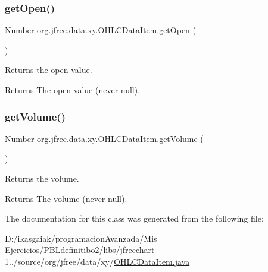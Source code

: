 \subsubsection{\texorpdfstring{get\+Open()}{getOpen()}}
{\footnotesize\ttfamily Number org.\+jfree.\+data.\+xy.\+O\+H\+L\+C\+Data\+Item.\+get\+Open (\begin{DoxyParamCaption}{ }\end{DoxyParamCaption})}

Returns the open value.

\begin{DoxyReturn}{Returns}
The open value (never {\ttfamily null}). 
\end{DoxyReturn}
\mbox{\label{classorg_1_1jfree_1_1data_1_1xy_1_1_o_h_l_c_data_item_ae70052475c3a64442bc59a8780f68d49}} 
\subsubsection{\texorpdfstring{get\+Volume()}{getVolume()}}
{\footnotesize\ttfamily Number org.\+jfree.\+data.\+xy.\+O\+H\+L\+C\+Data\+Item.\+get\+Volume (\begin{DoxyParamCaption}{ }\end{DoxyParamCaption})}

Returns the volume.

\begin{DoxyReturn}{Returns}
The volume (never {\ttfamily null}). 
\end{DoxyReturn}


The documentation for this class was generated from the following file\+:\begin{DoxyCompactItemize}
\item 
D\+:/ikasgaiak/programacion\+Avanzada/\+Mis Ejercicios/\+P\+B\+Ldefinitibo2/libs/jfreechart-\/1../source/org/jfree/data/xy/\mbox{\hyperlink{_o_h_l_c_data_item_8java}{O\+H\+L\+C\+Data\+Item.\+java}}\end{DoxyCompactItemize}
